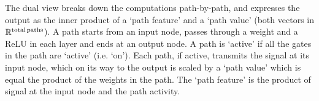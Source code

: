 The dual view breaks down the computations path-by-path, and expresses the output as the inner product of a `path feature' and a `path value' (both vectors in $\mathbb{R}^{\text{total\,paths}}$).
A path starts from an input node, passes through a weight and a ReLU in each layer and ends at an output node. 
A path is `active'  if all the gates in the path are `active' (i.e. `on'). Each path, if active, transmits the signal at its input node, which on its way to the output is scaled by a `path value' which is equal the product of the weights in the path. The `path feature' is the product of signal at the input node and the path activity. %





